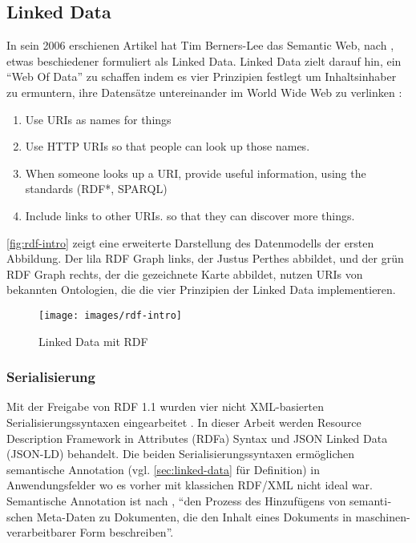 \subsection{Linked Data}
\label{sec:linked-data}

In sein 2006 erschienen Artikel hat Tim Berners-Lee das Semantic Web, nach \citeauthor{dewilde2015information}, etwas beschiedener formuliert als Linked Data. Linked Data zielt darauf hin, ein \hyphenquote{german}{Web Of Data} zu schaffen indem es vier Prinzipien festlegt um Inhaltsinhaber zu ermuntern, ihre Datensätze untereinander im World Wide Web zu verlinken \parencite{berners2006linked}: 

\begin{enumerate}
	\item Use URIs as names for things
	\item Use HTTP URIs so that people can look up those names.
	\item When someone looks up a URI, provide useful information, using the standards (RDF*, SPARQL)
	\item Include links to other URIs. so that they can discover more things.
\end{enumerate}

\autoref{fig:rdf-intro} zeigt eine erweiterte Darstellung des Datenmodells der ersten Abbildung. Der lila RDF Graph links, der Justus Perthes abbildet, und der grün RDF Graph rechts, der die gezeichnete Karte abbildet, nutzen URIs von bekannten Ontologien, die die vier Prinzipien der Linked Data implementieren.

\begin{figure}[h]
	\centering
	\texttt{[image: images/rdf-intro]}
	\caption[Linked Data mit RDF]{Linked Data mit RDF}
	\label{fig:rdf-intro}
\end{figure}

\subsubsection{Serialisierung}
\label{sec:serialisierung}

Mit der Freigabe von RDF 1.1 wurden vier nicht XML-basierten Serialisierungssyntaxen eingearbeitet \parencite[vgl.][Abs.~3]{Wood:14:WNR}. In dieser Arbeit werden Resource Description Framework in Attributes (RDFa) Syntax und JSON Linked Data (JSON-LD) behandelt. Die beiden Serialisierungssyntaxen ermöglichen semantische Annotation (vgl. \autoref{sec:linked-data} für Definition) in Anwendungsfelder wo es vorher mit klassichen RDF/XML nicht ideal war. Semantische Annotation ist nach \citeauthor[S.~405f]{reif2006semantic}, \hyphenquote{german}{den Prozess des Hinzufügens von semantischen Meta-Daten zu Dokumenten, die den Inhalt eines Dokuments in maschinen-verarbeitbarer Form beschreiben}.

